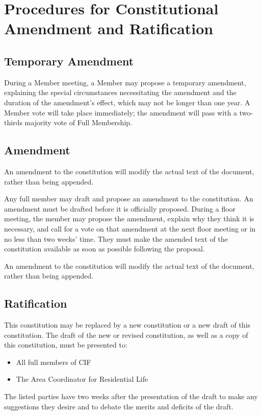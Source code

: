 \section{Procedures for Constitutional Amendment and Ratification}
\label{sec:amendment-and-ratification}



	\subsection{Temporary Amendment}

During a Member meeting, a Member may propose a temporary amendment, explaining the special circumstances necessitating the amendment and the duration of the amendment’s effect, which may not be longer than one year. A Member vote will take place immediately; the amendment will pass with a two-thirds majority vote of Full Membership.



	\subsection{Amendment}

An amendment to the constitution will modify the actual text of the document, rather than being appended.

Any full member may draft and propose an amendment to the constitution. An amendment must be drafted before it is officially proposed. During a floor meeting, the member may propose the amendment, explain why they think it is necessary, and call for a vote on that amendment at the next floor meeting or in no less than two weeks' time. They must make the amended text of the constitution available as soon as possible following the proposal.

An amendment to the constitution will modify the actual text of the document, rather than being appended.



	\subsection{Ratification}

This constitution may be replaced by a new constitution or a new draft of this constitution. The draft of the new or revised constitution, as well as a copy of this constitution, must be presented to:
\begin{itemize}
	\item All full members of CIF
	\item The Area Coordinator for Residential Life
\end{itemize}
The listed parties have two weeks after the presentation of the draft to make any suggestions they desire and to debate the merits and deficits of the draft.

